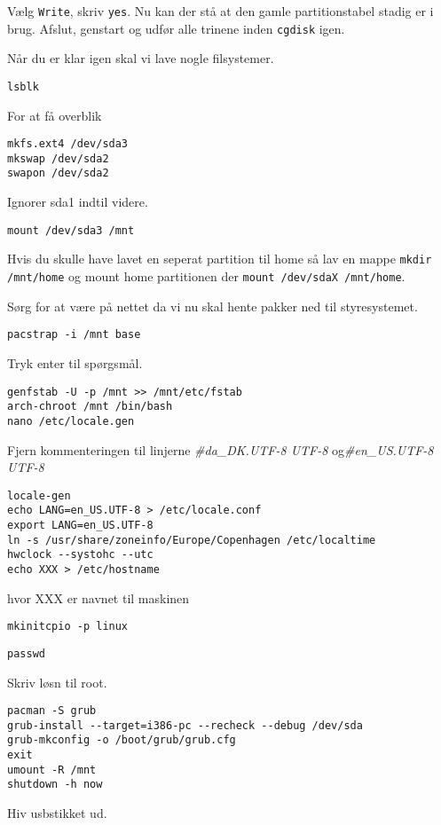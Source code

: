 \documentclass[10pt,a4paper,danish]{article}
\begin{document}
Vælg \texttt{Write}, skriv \texttt{yes}.
Nu kan der stå at den gamle partitionstabel stadig er i brug.
Afslut, genstart og udfør alle trinene inden \texttt{cgdisk} igen.

Når du er klar igen skal vi lave nogle filsystemer.
\begin{verbatim}
lsblk
\end{verbatim}
For at få overblik

\begin{verbatim}
mkfs.ext4 /dev/sda3
mkswap /dev/sda2
swapon /dev/sda2
\end{verbatim}

Ignorer sda1 indtil videre.

\begin{verbatim}
mount /dev/sda3 /mnt
\end{verbatim}

Hvis du skulle have lavet en seperat partition til home så lav en mappe
\texttt{mkdir /mnt/home} og mount home partitionen der \texttt{mount /dev/sdaX
  /mnt/home}.

Sørg for at være på nettet da vi nu skal hente pakker ned til styresystemet.
\begin{verbatim}
pacstrap -i /mnt base
\end{verbatim}
Tryk enter til spørgsmål.

\begin{verbatim}
genfstab -U -p /mnt >> /mnt/etc/fstab
arch-chroot /mnt /bin/bash
nano /etc/locale.gen
\end{verbatim}

Fjern kommenteringen til linjerne \textit{\#da\_DK.UTF-8 UTF-8} og\textit{\#en\_US.UTF-8 UTF-8}

\begin{verbatim}
locale-gen
echo LANG=en_US.UTF-8 > /etc/locale.conf
export LANG=en_US.UTF-8
ln -s /usr/share/zoneinfo/Europe/Copenhagen /etc/localtime
hwclock --systohc --utc
echo XXX > /etc/hostname
\end{verbatim}
hvor XXX er navnet til maskinen

\begin{verbatim}
mkinitcpio -p linux
\end{verbatim}
\begin{verbatim}
passwd
\end{verbatim}
Skriv løsn til root.

\begin{verbatim}
pacman -S grub
grub-install --target=i386-pc --recheck --debug /dev/sda
grub-mkconfig -o /boot/grub/grub.cfg
exit
umount -R /mnt
shutdown -h now
\end{verbatim}
Hiv usbstikket ud.
\end{document}
